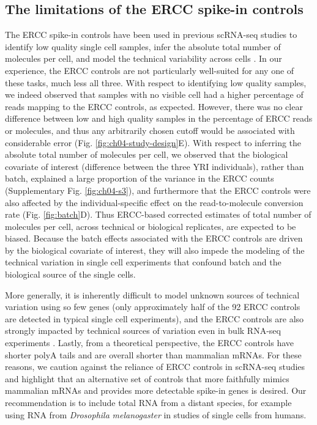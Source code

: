 \subsection{The limitations of the ERCC spike-in
controls}\label{the-limitations-of-the-ercc-spike-in-controls}

The ERCC spike-in controls have been used in previous scRNA-seq
studies to identify low quality single cell samples, infer the
absolute total number of molecules per cell, and model the technical
variability across cells \citep{Brennecke2013, Grun2014, Ding2015,
  Vallejos2015}. In our experience, the ERCC controls are not
particularly well-suited for any one of these tasks, much less all
three. With respect to identifying low quality samples, we indeed
observed that samples with no visible cell had a higher percentage of
reads mapping to the ERCC controls, as expected. However, there was no
clear difference between low and high quality samples in the
percentage of ERCC reads or molecules, and thus any arbitrarily chosen
cutoff would be associated with considerable error
(Fig. \ref{fig:ch04-study-design}E). With respect to inferring the
absolute total number of molecules per cell, we observed that the
biological covariate of interest (difference between the three YRI
individuals), rather than batch, explained a large proportion of the
variance in the ERCC counts (Supplementary Fig. \ref{fig:ch04-s3}),
and furthermore that the ERCC controls were also affected by the
individual-specific effect on the read-to-molecule conversion rate
(Fig. \ref{fig:batch}D). Thus ERCC-based corrected estimates of total
number of molecules per cell, across technical or biological
replicates, are expected to be biased. Because the batch effects
associated with the ERCC controls are driven by the biological
covariate of interest, they will also impede the modeling of the
technical variation in single cell experiments that confound batch and
the biological source of the single cells.

More generally, it is inherently difficult to model unknown sources of
technical variation using so few genes \citep{Risso2014} (only
approximately half of the 92 ERCC controls are detected in typical
single cell experiments), and the ERCC controls are also strongly
impacted by technical sources of variation even in bulk RNA-seq
experiments \citep{SEQC/MAQC-IIIConsortium2014}. Lastly, from a
theoretical perspective, the ERCC controls have shorter polyA tails
and are overall shorter than mammalian mRNAs. For these reasons, we
caution against the reliance of ERCC controls in scRNA-seq studies and
highlight that an alternative set of controls that more faithfully
mimics mammalian mRNAs and provides more detectable spike-in genes is
desired.  Our recommendation is to include total RNA from a distant
species, for example using RNA from \emph{Drosophila}
\emph{melanogaster} in studies of single cells from humans.

